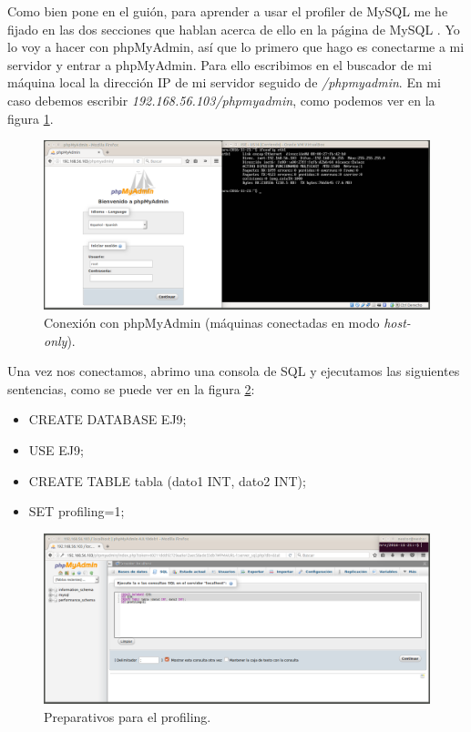 \documentclass[a4paper,titlepage,12pt]{scrartcl}	%
\numberwithin{figure}{section} %
\numberwithin{table}{section} %
\begin{document}
	Como bien pone en el guión, para aprender a usar el profiler de MySQL me he fijado en las dos secciones que hablan acerca de ello en la página de MySQL \cite{mysql} \cite{mysql2}. Yo lo voy a hacer con phpMyAdmin, así que lo primero que hago es conectarme a mi servidor y entrar a phpMyAdmin. Para ello escribimos en el buscador de mi máquina local la dirección IP de mi servidor seguido de \textit{/phpmyadmin}. En mi caso debemos escribir \textit{192.168.56.103/phpmyadmin}, como podemos ver en la figura \ref{9-1}.

	\begin{figure}[H]
		\includegraphics[width=\linewidth]{./Imagenes/9-1.png}
		\vspace{-0.5cm}
		\caption[Conexión con phpMyAdmin (máquinas conectadas en modo \textit{host-only}).]{Conexión con phpMyAdmin (máquinas conectadas en modo \textit{host-only}).}
		\label{9-1}
	\end{figure}
	
	Una vez nos conectamos, abrimo una consola de SQL y ejecutamos las siguientes sentencias, como se puede ver en la figura \ref{9-2}:
	\begin{itemize}
		\item CREATE DATABASE EJ9;
		\item USE EJ9;
		\item CREATE TABLE tabla (dato1 INT, dato2 INT);
		\item SET profiling=1;
	\end{itemize}
	
	\begin{figure}[H]
		\includegraphics[width=\linewidth]{./Imagenes/9-2.png}
		\vspace{-0.5cm}
		\caption[Preparativos para el profiling.]{Preparativos para el profiling.}
		\label{9-2}
	\end{figure}
	
\end{document}

